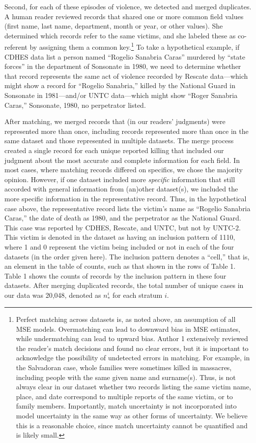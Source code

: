 \documentclass[11pt,]{article}
\let\rmarkdownfootnote\footnote%
\def\footnote{\protect\rmarkdownfootnote}
\begin{document}
Second, for each of these episodes of violence, we detected and merged
duplicates. A human reader reviewed records that shared one or more
common field values (first name, last name, department, month or year,
or other values). She determined which records refer to the same
victims, and she labeled these as co-referent by assigning them a common
key.\footnote{Perfect matching across datasets is, as noted above, an
  assumption of all MSE models. Overmatching can lead to downward bias
  in MSE estimates, while undermatching can lead to upward bias. Author
  1 extensively reviewed the reader's match decisions and found no clear
  errors, but it is important to acknowledge the possibility of
  undetected errors in matching. For example, in the Salvadoran case,
  whole families were sometimes killed in massacres, including people
  with the same given name and surname(s). Thus, is not always clear in
  our dataset whether two records listing the same victim name, place,
  and date correspond to multiple reports of the same victim, or to
  family members. Importantly, match uncertainty is not incorporated
  into model uncertainty in the same way as other forms of uncertainty.
  We believe this is a reasonable choice, since match uncertainty cannot
  be quantified and is likely small.} To take a hypothetical example, if
CDHES data list a person named ``Rogelio Sanabria Caras'' murdered by
``state forces'' in the department of Sonsonate in 1980, we need to
determine whether that record represents the same act of violence
recorded by Rescate data---which might show a record for ``Rogelio
Sanabria,'' killed by the National Guard in Sonsonate in 1981---and/or
UNTC data---which might show ``Roger Sanabria Caras,'' Sonsonate, 1980,
no perpetrator listed.

After matching, we merged records that (in our readers' judgments) were
represented more than once, including records represented more than once
in the same dataset and those represented in multiple datasets. The
merge process created a single record for each unique reported killing
that included our judgment about the most accurate and complete
information for each field. In most cases, where matching records
differed on specifics, we chose the majority opinion. However, if one
dataset included more \emph{specific} information that still accorded
with general information from (an)other dataset(s), we included the more
specific information in the representative record. Thus, in the
hypothetical case above, the representative record lists the victim's
name as ``Rogelio Sanabria Caras,'' the date of death as 1980, and the
perpetrator as the National Guard. This case was reported by CDHES,
Rescate, and UNTC, but not by UNTC-2. This victim is denoted in the
dataset as having an inclusion pattern of 1110, where 1 and 0 represent
the victim being included or not in each of the four datasets (in the
order given here). The inclusion pattern denotes a ``cell,'' that is, an
element in the table of counts, such as that shown in the rows of Table
1. Table 1 shows the counts of records by the inclusion pattern in these
four datasets. After merging duplicated records, the total number of
unique cases in our data was 20,048, denoted as \(n^{i}_{*}\) for each
stratum \(i\).
\end{document}
